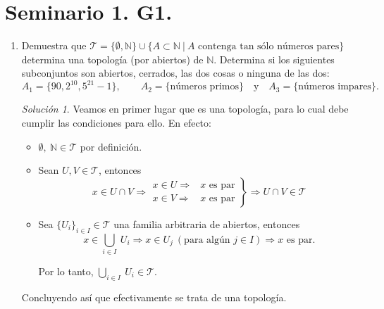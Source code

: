 \documentclass[12pt,twoside]{report}
\newcommand\mc[1]{\mathcal{#1}}
\theoremstyle{azul}
\theoremstyle{azul2}
\theoremstyle{plain}
\theoremstyle{definition}
\theoremstyle{remark}
\newtheorem*{sol}{Solución}
\begin{document}
\section{Seminario 1. G1.}
\justifying
\begin{enumerate}
    \item \justifying Demuestra que $\mc{T}=\{\emptyset,\mathbb{N}\} \cup \{A \subset \mathbb{N}\: | \: A \text{ contenga tan s{\'o}lo n{\'u}meros pares}\}$ determina una topolog{\'i}a (por abiertos) de $\mathbb{N}$. Determina si los siguientes subconjuntos son abiertos, cerrados, las dos cosas o ninguna de las dos:
    $$A_1=\{90, 2^{10}, 5^{21}-1\}, \qquad A_2=\{\text{n{\'u}meros primos}\}\quad \text{y} \quad A_3 = \{\text{n{\'u}meros impares}\}.$$
    \begin{sol}
    Veamos en primer lugar que es una topolog{\'i}a, para lo cual debe cumplir las condiciones para ello. En efecto:
    \begin{itemize}
        \item $\emptyset, \: \mathbb{N} \in \mc{T}$ por definici{\'o}n. 
        \item Sean $U, V \in \mc{T}$, entonces
        $$x \in U \cap V \Rightarrow \left.\begin{array}{cc}
             x \in U \Rightarrow & x \text{ es par} \\
             x \in V \Rightarrow & x \text{ es par}
        \end{array}\right\} \Rightarrow U \cap V \in \mc{T}$$
        \item Sea $\{U_i\}_{i \in I} \in \mc{T}$ una familia arbitraria de abiertos, entonces
        $$x \in \underset{i \in I}{\bigcup}\: U_i \Rightarrow x \in U_j \: (\text{para alg{\'u}n } j \in I) \Rightarrow x \text{ es par.}$$
        
        Por lo tanto, $\underset{i \in I}{\displaystyle\bigcup}\: U_i \in \mc{T}$.
    \end{itemize}
    Concluyendo as{\'i} que efectivamente se trata de una topolog{\'i}a. 
    

\end{sol}
\end{enumerate}
\end{document}
